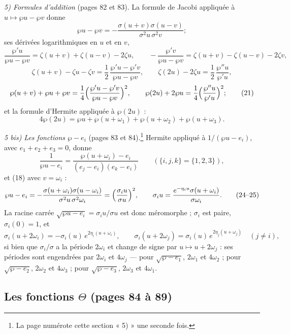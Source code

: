 \documentclass[11pt,a4paper]{article}
\begin{document}
\emph{5) Formules d'addition} (pages 82 et 83). La formule de Jacobi appliquée
à $u \mapsto \wp u - \wp v$ donne
\[
\wp u - \wp v = -\frac{\sigma(u+v)\sigma(u-v)}{\sigma^2u\,\sigma^2v} ; \tag{18}
\]
ses dérivées logarithmiques en $u$ et en $v$,
\[
\frac{\wp'u}{\wp u - \wp v} = \zeta(u+v) + \zeta(u-v) - 2\zeta u, \qquad
-\frac{\wp'v}{\wp u - \wp v} = \zeta(u+v) - \zeta(u-v) - 2\zeta v, \tag{19}
\]
\[
\zeta(u+v) - \zeta u - \zeta v = \frac12\,\frac{\wp'u - \wp'v}{\wp u - \wp v},
\qquad \zeta(2u) - 2\zeta u = \frac12\,\frac{\wp''u}{\wp'u}, \tag{20}
\]
\[
\wp(u+v) + \wp u + \wp v = \frac14\Bigl(\frac{\wp'u - \wp'v}{\wp u -
\wp v}\Bigr)^2, \qquad \wp(2u) + 2\wp u = \frac14\Bigl(\frac{\wp''u}{\wp'u}\Bigr)^2 ;
\tag{21}
\]
et la formule d'Hermite appliquée à $\wp(2u)$ :
\[
4\wp(2u) = \wp u + \wp(u + \omega_1) + \wp(u + \omega_2) + \wp(u + \omega_3) .
\tag{22}
\]

\emph{5 bis) Les fonctions $\wp - e_i$} (pages 83 et 84).\footnote{La page
numérote cette section « 5) » une seconde fois.} Hermite appliqué à $1/(\wp u -
e_i)$, avec $e_1 + e_2 + e_3 = 0$, donne
\[
\frac{1}{\wp u - e_i} = \frac{\wp(u + \omega_i) - e_i}{(e_j - e_i)(e_k - e_i)}
\qquad (\{i, j, k\} = \{1, 2, 3\}), \tag{23}
\]
et (18) avec $v = \omega_i$ :
\[
\wp u - e_i = -\frac{\sigma(u + \omega_i)\sigma(u - \omega_i)}{\sigma^2u\,
\sigma^2\omega_i} = \Bigl(\frac{\sigma_i u}{\sigma u}\Bigr)^2, \qquad
\sigma_i u = \frac{e^{-\eta_i u}\sigma(u + \omega_i)}{\sigma\omega_i} .
\tag{24--25}
\]
La racine carrée $\sqrt{\wp u - e_i} = \sigma_i u/\sigma u$ est donc méromorphe ;
$\sigma_i$ est paire, $\sigma_i(0) = 1$, et
\[
\sigma_i(u + 2\omega_i) = -\sigma_i(u)\,e^{2\eta_i(u + \omega_i)}, \qquad
\sigma_i(u + 2\omega_j) = \sigma_i(u)\,e^{2\eta_j(u + \omega_j)} \quad (j \neq i),
\tag{26}
\]
si bien que $\sigma_i/\sigma$ a la période $2\omega_i$ et change de signe par $u
\mapsto u + 2\omega_j$ : ses périodes sont engendrées par $2\omega_i$ et
$4\omega_j$ --- pour $\sqrt{\wp - e_1}$, $2\omega_1$ et $4\omega_2$ ; pour
$\sqrt{\wp - e_2}$, $2\omega_2$ et $4\omega_3$ ; pour $\sqrt{\wp - e_3}$,
$2\omega_3$ et $4\omega_1$.

\subsection*{Les fonctions $\Theta$ (pages 84 à 89)}
\end{document}
